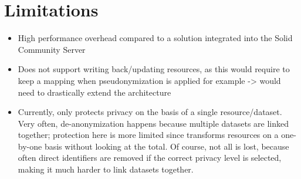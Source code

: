 \section{Limitations}
\label{sec:limitations}
\begin{itemize}
    \item High performance overhead compared to a solution integrated into the Solid Community Server
    \item Does not support writing back/updating resources, as this would require to keep a mapping when pseudonymization is applied for example -> would need to drastically extend the architecture
    \item Currently, only protects privacy on the basis of a single resource/dataset. Very often, de-anonymization happens because multiple datasets are linked together; protection here is more limited since \middleware{} transforms resources on a one-by-one basis without looking at the total. Of course, not all is lost, because often direct identifiers are removed if the correct privacy level is selected, making it much harder to link datasets together.
    
\end{itemize}